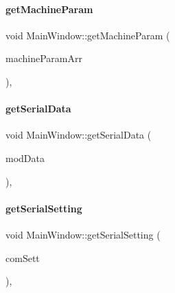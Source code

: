 \mbox{\label{classMainWindow_a2dc63192aa7ff54dfc64e8308712c287}} 
\paragraph{\texorpdfstring{get\+Machine\+Param}{getMachineParam}}
{\footnotesize\ttfamily void Main\+Window\+::get\+Machine\+Param (\begin{DoxyParamCaption}\item[{Q\+Byte\+Array}]{machine\+Param\+Arr }\end{DoxyParamCaption})\hspace{0.3cm}{\ttfamily [private]}, {\ttfamily [slot]}}

\mbox{\label{classMainWindow_a98db3a076389e7afc0f51bf980566851}} 
\paragraph{\texorpdfstring{get\+Serial\+Data}{getSerialData}}
{\footnotesize\ttfamily void Main\+Window\+::get\+Serial\+Data (\begin{DoxyParamCaption}\item[{\mbox{\hyperlink{serialport_8h_a2331c0232719069f0bce03c249d2eec6}{Mod\+Data}}}]{mod\+Data }\end{DoxyParamCaption})\hspace{0.3cm}{\ttfamily [private]}, {\ttfamily [slot]}}

\mbox{\label{classMainWindow_a477250c56749d4db7cf5d94ea30145cf}} 
\paragraph{\texorpdfstring{get\+Serial\+Setting}{getSerialSetting}}
{\footnotesize\ttfamily void Main\+Window\+::get\+Serial\+Setting (\begin{DoxyParamCaption}\item[{\mbox{\hyperlink{structComSettings}{Com\+Settings}}}]{com\+Sett }\end{DoxyParamCaption})\hspace{0.3cm}{\ttfamily [private]}, {\ttfamily [slot]}}


